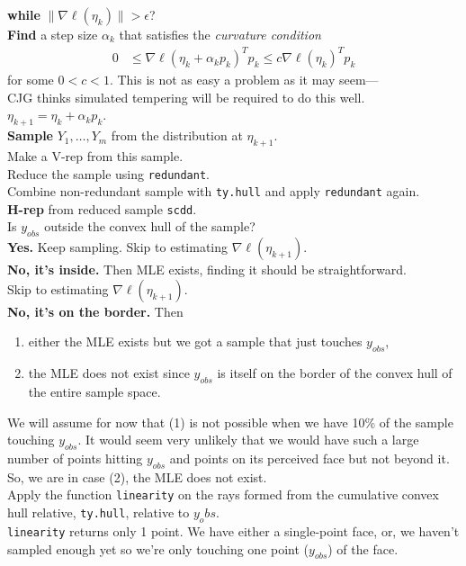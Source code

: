 \documentclass{amsbook}
\theoremstyle{definition}
\theoremstyle{remark}
\begin{document}
\noindent \textbf{while}  $\lVert \nabla \ell( \eta_k) \rVert > \epsilon$? \\ 
\hspace{4mm} \indent	 \textbf{Find} a step size $\alpha_k$ that satisfies the \textit{curvature condition}
\begin{align*}
	 0 & \leq \nabla \ell( \eta_k + \alpha_k p_k)^T p_k \leq c \nabla \ell(\eta_k)^T p_k
\end{align*}
\indent for some $0 < c < 1$.  This is not as easy a problem as it may seem---\\
\indent CJG thinks simulated tempering will be required to do this well.\\

$\eta_{k+1} = \eta_k + \alpha_k p_k$.\\
\indent \textbf{Sample} $Y_1, \ldots, Y_m$ from the distribution at $\eta_{k+1}$.\\
\indent Make a V-rep from this sample.\\
\indent Reduce the sample using \texttt{redundant}.\\
\indent Combine non-redundant sample with \texttt{ty.hull} and apply \texttt{redundant} again.\\

\indent \textbf{H-rep} from reduced sample \texttt{scdd}.  \\
\indent \indent Is $y_{obs}$ outside the convex hull of the sample?\\
\indent \indent \textbf{Yes.}  Keep sampling.  Skip to estimating $\nabla \ell( \eta_{k+1})$.\\
\indent \indent \textbf{No, it's inside.}  Then MLE exists, finding it should be straightforward.\\  \indent \indent Skip to estimating $\nabla \ell( \eta_{k+1})$.\\
\indent \indent \textbf{No, it's on the border.}  Then 
\indent \indent \begin{enumerate}
\item either the MLE exists but we got a sample that just touches $y_{obs}$, 
\item the MLE does not exist since $y_{obs}$ is itself on the border of the convex hull of the entire sample space.
\end{enumerate}

\indent \indent We will assume for now that (1) is not possible when we have 10\% of the sample touching $y_{obs}$.  It would seem very unlikely that we would have such a large number of points hitting $y_{obs}$ and points on its perceived face but not beyond it.\\
\indent \indent So, we are in case (2), the MLE does not exist.\\
\indent \indent Apply the function \texttt{linearity} on the rays formed from the cumulative convex hull relative, \texttt{ty.hull}, relative to $y_obs$.  \\
\indent \indent \texttt{linearity} returns only 1 point.  We have either a single-point face, or, we haven't sampled enough yet so we're only touching one point ($y_{obs}$) of the face.
\end{document}
